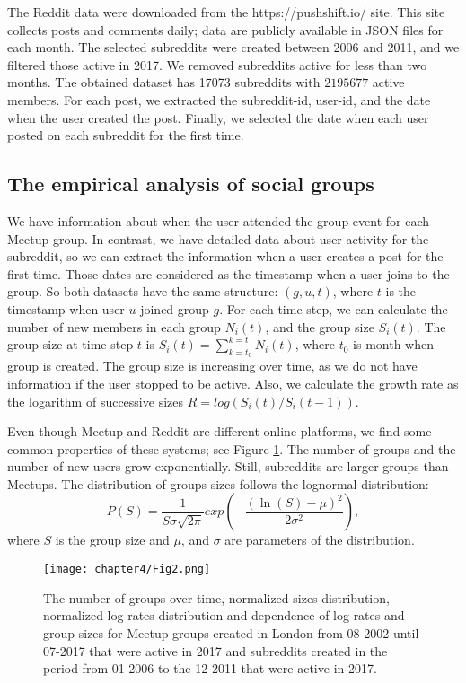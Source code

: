 The Reddit data were downloaded from the https://pushshift.io/ site. This site collects posts and comments daily; data are publicly available in JSON files for each month. The selected subreddits were created between 2006 and 2011, and we filtered those active in 2017. We removed subreddits active for less than two months. The obtained dataset has 17073 subreddits with $2 195 677$ active members. For each post, we extracted the subreddit-id, user-id, and the date when the user created the post. Finally, we selected the date when each user posted on each subreddit for the first time. 

\subsection{The empirical analysis of social groups}

We have information about when the user attended the group event for each Meetup group. In contrast, we have detailed data about user activity for the subreddit, so we can extract the information when a user creates a post for the first time. Those dates are considered as the timestamp when a user joins to the group. So both datasets have the same structure: $(g, u, t)$, where $t$ is the timestamp when user $u$ joined group $g$. For each time step, we can calculate the number of new members in each group $N_i(t)$, and the group size $S_{i}(t)$. The group size at time step $t$ is $S_{i}(t)=\sum^{k=t}_{k=t_{0}}N_{i}(t)$, where $t_0$ is month when group is created. The group size is increasing over time, as we do not have information if the user stopped to be active. Also, we calculate the growth rate as the logarithm of successive sizes $R = log(S_{i}(t)/S_{i}(t-1))$.

Even though Meetup and Reddit are different online platforms, we find some common properties of these systems; see Figure \ref{fig:data1}. The number of groups and the number of new users grow exponentially. Still, subreddits are larger groups than Meetups. The distribution of groups sizes follows the lognormal distribution:
\begin{equation}
P(S)=\frac{1}{S\sigma\sqrt{2\pi}}exp(-\frac{(\ln(S)-\mu)^{2}}{2\sigma^{2}}),
\label{eq:log}
\end{equation}
where $S$ is the group size and $\mu$, and $\sigma$ are parameters of the distribution.

\begin{figure}[h]
	\centering
	\texttt{[image: chapter4/Fig2.png]}
	\caption[Properties of Meetup and Subreddit groups.]{The number of groups over time, normalized sizes distribution, normalized log-rates distribution and dependence of log-rates and group sizes for Meetup groups created in London from 08-2002 until 07-2017 that were active in 2017 and subreddits created in the period from 01-2006 to the  12-2011 that were active in 2017.}
	\label{fig:data1}
\end{figure}   

